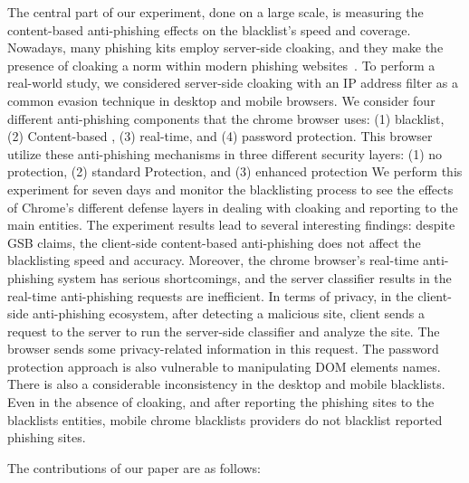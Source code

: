 The central part of our experiment, done on a large scale, is measuring the content-based anti-phishing effects on the blacklist's speed and coverage.
Nowadays, many phishing kits employ server-side cloaking, and they make the presence of cloaking a  norm within modern phishing websites~\cite{oest2018inside}.
To perform a real-world study, we considered server-side cloaking with an IP address filter as a common evasion technique in desktop and mobile browsers.
We consider four different anti-phishing components that the chrome browser uses: (1) blacklist, (2) Content-based , (3) real-time, and (4) password protection. This browser utilize these anti-phishing mechanisms in three different security layers: (1) no protection, (2) standard Protection, and (3) enhanced protection
We perform this experiment for seven days and monitor the blacklisting process to see the effects of Chrome's different defense layers in dealing with cloaking and reporting to the main entities.
The experiment results lead to several interesting findings: 
despite GSB claims, the client-side content-based anti-phishing does not affect the blacklisting speed and accuracy.
Moreover, the chrome browser's real-time anti-phishing system has serious shortcomings, and the server classifier results in the real-time anti-phishing requests are inefficient. 
In terms of privacy, in the client-side anti-phishing ecosystem, after detecting a malicious site, client sends a request to the server to run the server-side classifier and analyze the site. The browser sends some privacy-related information in this request.
The password protection approach is also vulnerable to manipulating DOM elements names. 
There is also a considerable inconsistency in the desktop and mobile blacklists. Even in the absence of cloaking, and after reporting the phishing sites to the blacklists entities, mobile chrome blacklists providers do not blacklist reported phishing sites.

The contributions of our paper are as follows:

